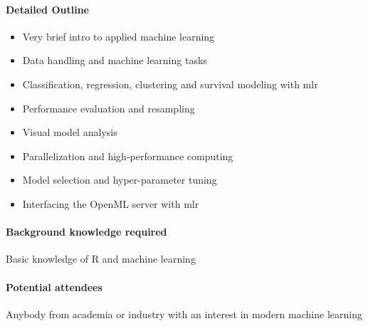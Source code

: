 \documentclass{article}
\begin{document}
\pagebreak

\paragraph{Detailed Outline}
\begin{itemize}
\item Very brief intro to applied machine learning
\item Data handling and machine learning tasks 
\item Classification, regression, clustering and survival modeling with mlr
\item Performance evaluation and resampling
\item Visual model analysis
\item Parallelization and high-performance computing
\item Model selection and hyper-parameter tuning
\item Interfacing the OpenML server with mlr
\end{itemize}

\paragraph{Background knowledge required} Basic knowledge of R and machine learning

\paragraph{Potential attendees} Anybody from academia or industry with an interest in modern machine learning
\end{document}
